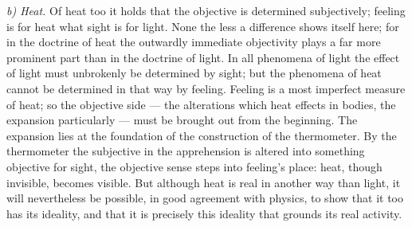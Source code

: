 \documentclass[12pt,a4paper]{book}
\newcommand{\runin}[1]{\emph{#1}\hspace{0.4em}}
\begin{document}
\runin{b) Heat.} Of heat too it holds that the objective is determined subjectively; feeling is for heat what sight is
for light. None the less a difference shows itself here; for in the doctrine of heat the outwardly immediate objectivity
plays a far more prominent part than in the doctrine of light. In all phenomena of light the effect of light must
unbrokenly be determined by sight; but the phenomena of heat cannot be determined in that way by feeling. Feeling is a
most imperfect measure of heat; so the objective side --- the alterations which heat effects in bodies, the expansion
particularly --- must be brought out from the beginning. The expansion
lies at the foundation of the construction of the thermometer. By the thermometer the subjective in the apprehension is
altered into something objective for sight, the objective sense steps into feeling's place: heat, though invisible,
becomes visible. But although heat is real in another way than light, it will nevertheless be possible, in good
agreement with physics, to show that it too has its ideality, and that it is precisely this ideality that grounds its
real activity.
\end{document}
